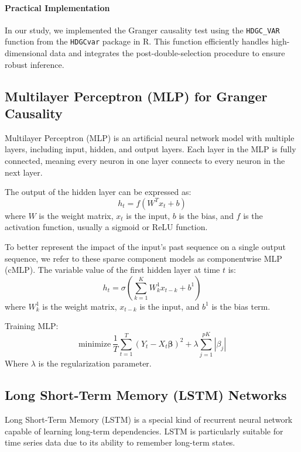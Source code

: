 \documentclass[11pt]{article}
\begin{document}
\paragraph{Practical Implementation}

In our study, we implemented the Granger causality test using the \texttt{HDGC\_VAR} function from the \texttt{HDGCvar} package in R. This function efficiently handles high-dimensional data and integrates the post-double-selection procedure to ensure robust inference.

\subsection{Multilayer Perceptron (MLP) for Granger Causality}
Multilayer Perceptron (MLP) is an artificial neural network model with multiple layers, including input, hidden, and output layers. Each layer in the MLP is fully connected, meaning every neuron in one layer connects to every neuron in the next layer.

The output of the hidden layer can be expressed as:
\begin{equation}
h_t = f(W^T x_t + b)
\end{equation}
where \( W \) is the weight matrix, \( x_t \) is the input, \( b \) is the bias, and \( f \) is the activation function, usually a sigmoid or ReLU function.

To better represent the impact of the input's past sequence on a single output sequence, we refer to these sparse component models as componentwise MLP (cMLP). The variable value of the first hidden layer at time \( t \) is:
\begin{equation}
h_t = \sigma\left(\sum_{k=1}^{K} W_{k}^{1} x_{t-k} + b^{1}\right)
\end{equation}
where \( W_{k}^{1} \) is the weight matrix, \( x_{t-k} \) is the input, and \( b^{1} \) is the bias term.

Training MLP:
\begin{equation}
\text{minimize} \ \frac{1}{T} \sum_{t=1}^T (Y_t - X_t \boldsymbol{\beta})^2 + \lambda \sum_{j=1}^{pK} |\beta_j|
\end{equation}
Where \( \lambda \) is the regularization parameter.

\subsection{Long Short-Term Memory (LSTM) Networks}
Long Short-Term Memory (LSTM) is a special kind of recurrent neural network capable of learning long-term dependencies. LSTM is particularly suitable for time series data due to its ability to remember long-term states.
\end{document}
